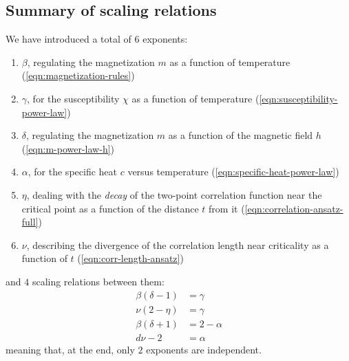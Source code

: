 \documentclass[../../main.tex]{subfiles}
\begin{document}
\subsection{Summary of scaling relations}
We have introduced a total of $6$ exponents:
\begin{enumerate}
    \item $\beta$, regulating the magnetization $m$ as a function of temperature (\ref{eqn:magnetization-rules})
    \item $\gamma$, for the susceptibility $\chi$ as a function of temperature (\ref{eqn:susceptibility-power-law})
    \item $\delta$, regulating the magnetization $m$ as a function of the magnetic field $h$ (\ref{eqn:m-power-law-h})
    \item $\alpha$, for the specific heat $c$ versus temperature (\ref{eqn:specific-heat-power-law})
    \item $\eta$, dealing with the \textit{decay} of the two-point correlation function near the critical point as a function of the distance $t$ from it (\ref{eqn:correlation-ansatz-full})
    \item $\nu$, describing the divergence of the correlation length near criticality as a function of $t$ (\ref{eqn:corr-length-ansatz})
\end{enumerate}
and $4$ scaling relations between them:
\begin{subequations}\label{eqn:scaling-relations}
    \begin{align}
        \beta (\delta - 1) &= \gamma\\
        \nu(2- \eta) &= \gamma\\
        \beta ( \delta + 1) &= 2 - \alpha\\
        d \nu -2 &= \alpha
    \end{align}
\end{subequations}
meaning that, at the end, only $2$ exponents are independent.

\end{document}
